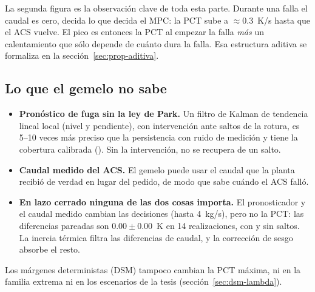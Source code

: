 \noindent La segunda figura es la observación clave de toda esta parte. Durante una falla el
caudal es cero, decida lo que decida el MPC: la PCT sube a $\approx0.3$~K/s hasta que el ACS
vuelve. El pico es entonces la PCT al empezar la falla \emph{más} un calentamiento que sólo
depende de cuánto dura la falla. Esa estructura aditiva se formaliza en la
sección~\ref{sec:prop-aditiva}.

\subsection{Lo que el gemelo no sabe}
\begin{itemize}
  \item \textbf{Pronóstico de fuga sin la ley de Park.} Un filtro de Kalman de tendencia
        lineal local (nivel y pendiente), con intervención ante saltos de la rotura, es 5--10
        veces más preciso que la persistencia con ruido de medición y tiene la cobertura
        calibrada (). Sin la intervención, no se
        recupera de un salto.
  \item \textbf{Caudal medido del ACS.} El gemelo puede usar el caudal que la planta recibió de
        verdad en lugar del pedido, de modo que sabe cuándo el ACS falló.
  \item \textbf{En lazo cerrado ninguna de las dos cosas importa.} El pronosticador y el caudal
        medido cambian las decisiones (hasta 4~kg/s), pero no la PCT: las diferencias pareadas
        son $0.00\pm0.00$~K en 14 realizaciones, con y sin saltos. La inercia térmica filtra las
        diferencias de caudal, y la corrección de sesgo absorbe el resto.
\end{itemize}
Los márgenes deterministas (DSM) tampoco cambian la PCT máxima, ni en la familia extrema ni en
los escenarios de la tesis (sección~\ref{sec:dsm-lambda}).


